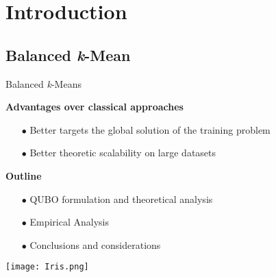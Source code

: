\section{Introduction}

\subsection{Balanced \textit{k}-Mean}
	\begin{frame}{Balanced \textit{k}-Means} %
		\small
		\begin{minipage}{0.5\textwidth} %
			\textbf{Advantages over classical approaches}
			\begin{itemize}
				\item[$\bullet$] Better targets the global solution of the training problem  
				\item[$\bullet$] Better theoretic scalability on large datasets
			\end{itemize}
		\end{minipage}\hfill
		\begin{minipage}{0.5\textwidth}
			\textbf{Outline}
			\begin{itemize}
				\item[$\bullet$] QUBO formulation and theoretical analysis
				\item[$\bullet$] Empirical Analysis 
				\item[$\bullet$] Conclusions and considerations
			\end{itemize}
		\end{minipage}
		\texttt{[image: Iris.png]}
	\end{frame}
	


